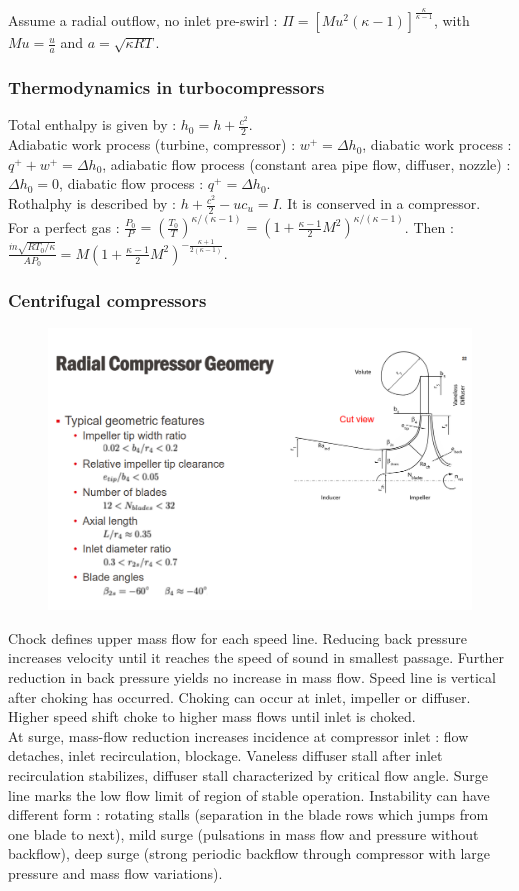 \documentclass[../main.tex]{subfiles}
\begin{document}
Assume a radial outflow, no inlet pre-swirl : $\Pi = [Mu^2 (\kappa-1) ]^{\frac{\kappa}{\kappa-1}}$, with $Mu = \frac{u}{a}$ and $a = \sqrt{\kappa R T}$.\\

\subsubsection{Thermodynamics in turbocompressors}
Total enthalpy is given by : $h_0 = h + \frac{c^2}{2}$.\\
Adiabatic work process (turbine, compressor) : $w^+ = \Delta h_0$, diabatic work process : $q^+ + w^+ = \Delta h_0$, adiabatic flow process (constant area pipe flow, diffuser, nozzle) : $\Delta h_0 = 0$, diabatic flow process : $q^+ = \Delta h_0$.\\

Rothalphy is described by : $h + \frac{c^2}{2} - u c_u = I$. It is conserved in a compressor.\\

For a perfect gas : $\frac{P_0}{P} = (\frac{T_0}{T})^{\kappa/(\kappa-1)} = (1+\frac{\kappa-1}{2} M^2)^{\kappa/(\kappa-1)}$. Then : $\frac{\dot{m} \sqrt{RT_0/\kappa}}{AP_0} = M (1+\frac{\kappa-1}{2}M^2)^{-\frac{\kappa+1}{2(\kappa-1)}}$.\\


\subsubsection{Centrifugal compressors}

\begin{figure}[hbt!]
    \centering
    \includegraphics[width=0.5\linewidth]{IMAGES/HP/Screenshot from 2025-05-01 10-31-05.png}
\end{figure}

Chock defines upper mass flow for each speed line. Reducing back pressure increases velocity until it reaches the speed of sound in smallest passage. Further reduction in back pressure yields no increase in mass flow. Speed line is vertical after choking has occurred. Choking can occur at inlet, impeller or diffuser. Higher speed shift choke to higher mass flows until inlet is choked. \\
At surge, mass-flow reduction increases incidence at compressor inlet : flow detaches, inlet recirculation, blockage. Vaneless diffuser stall after inlet recirculation stabilizes, diffuser stall characterized by critical flow angle. Surge line marks the low flow limit of region of stable operation. Instability can have different form : rotating stalls (separation in the blade rows which jumps from one blade to next), mild surge (pulsations in mass flow and pressure without backflow), deep surge (strong periodic backflow through compressor with large pressure and mass flow variations).
\end{document}
